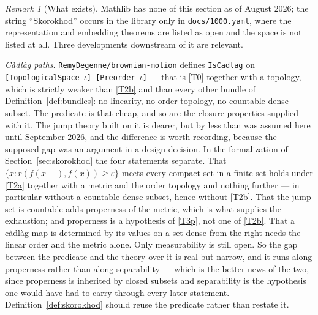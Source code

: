 \documentclass[11pt,a4paper]{article}
\theoremstyle{plain}
\theoremstyle{definition}
\theoremstyle{remark}
\newtheorem{remark}[theorem]{Remark}
\begin{document}
\begin{remark}[What exists]
  \label{rem:skorokhodform}
  Mathlib has none of this section as of August 2026; the string
  ``Skorokhod'' occurs in the library only in \texttt{docs/1000.yaml}, where the
  representation and embedding theorems are listed as open and the space is not
  listed at all.  Three developments downstream of it are relevant.

  \emph{C\`adl\`ag paths.}  \texttt{RemyDegenne/brownian-motion} defines
  \texttt{IsCadlag} on \texttt{[TopologicalSpace }$\iota$\texttt{] [Preorder
  }$\iota$\texttt{]} --- that is \eqref{T0} together with a topology, which is
  strictly weaker than \eqref{T2b} and than every other bundle of
  Definition~\ref{def:bundles}: no linearity, no order topology, no countable
  dense subset.  The predicate is that cheap, and so are the closure properties
  supplied with it.  The jump theory built on it is dearer, but by less than was
  assumed here until September 2026, and the difference is worth recording,
  because the supposed gap was an argument in a design decision.  In the
  formalization of Section~\ref{sec:skorokhod} the four statements separate.
  That $\{x : r(f(x-),f(x)) \geq \varepsilon\}$ meets every compact set in a
  finite set holds under \eqref{T2a} together with a metric and the order
  topology and nothing further --- in particular without a countable dense
  subset, hence without \eqref{T2b}.  That the jump set is countable adds
  properness of the metric, which is what supplies the exhaustion; and properness
  is a hypothesis of \eqref{T3p}, not one of \eqref{T2b}.  That a c\`adl\`ag
  map is determined by its values on a set dense from the right needs the linear
  order and the metric alone.  Only measurability is still open.  So the gap
  between the predicate and the theory over it is real but narrow, and it runs
  along properness rather than along separability --- which is the better news of
  the two, since properness is inherited by closed subsets and separability is
  the hypothesis one would have had to carry through every later statement.
  Definition~\ref{def:skorokhod} should reuse the predicate rather than restate
  it.


\end{remark}
\end{document}
